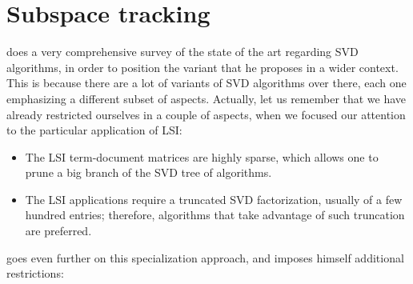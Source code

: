 \section{Subspace tracking}

\Rehurek does a very comprehensive survey of the state of the art
regarding SVD algorithms, in order to position the variant that he
proposes in a wider context. This is because there are a lot of
variants of SVD algorithms over there, each one emphasizing a
different subset of aspects. Actually, let us remember that we have
already restricted ourselves in a couple of aspects, when we focused
our attention to the particular application of LSI: \\

\begin{itemize}
\item The LSI term-document matrices are highly sparse, which allows
  one to prune a big branch of the SVD tree of algorithms. 
\item The LSI applications require a truncated SVD factorization,
  usually of a few hundred entries; therefore, algorithms that take
  advantage of such truncation are preferred. 
\end{itemize}
\hfill

\Rehurek goes even further on this specialization approach, and
imposes himself additional restrictions:

